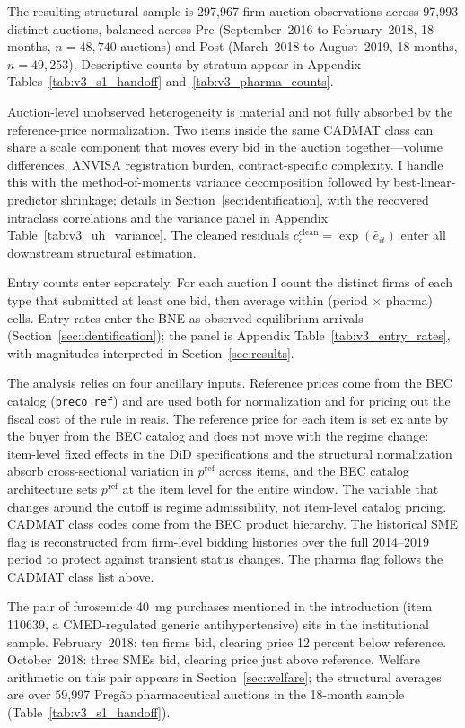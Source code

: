 The resulting structural sample is 297{,}967 firm-auction observations across 97{,}993 distinct auctions, balanced across Pre (September~2016 to February~2018, 18 months, $n = 48{,}740$ auctions) and Post (March~2018 to August~2019, 18 months, $n = 49{,}253$). Descriptive counts by stratum appear in Appendix Tables~\ref{tab:v3_s1_handoff} and~\ref{tab:v3_pharma_counts}.

Auction-level unobserved heterogeneity is material and not fully absorbed by the reference-price normalization. Two items inside the same CADMAT class can share a scale component that moves every bid in the auction together---volume differences, ANVISA registration burden, contract-specific complexity. I handle this with the \citet{krasnokutskaya2011} method-of-moments variance decomposition followed by best-linear-predictor shrinkage; details in Section~\ref{sec:identification}, with the recovered intraclass correlations and the variance panel in Appendix Table~\ref{tab:v3_uh_variance}. The cleaned residuals $c_\epsilon^{\text{clean}} = \exp(\hat e_{it})$ enter all downstream structural estimation.

Entry counts enter separately. For each auction I count the distinct firms of each type that submitted at least one bid, then average within (period $\times$ pharma) cells. Entry rates enter the BNE as observed equilibrium arrivals (Section~\ref{sec:identification}); the panel is Appendix Table~\ref{tab:v3_entry_rates}, with magnitudes interpreted in Section~\ref{sec:results}.

The analysis relies on four ancillary inputs. Reference prices come from the BEC catalog (\texttt{preco\_ref}) and are used both for normalization and for pricing out the fiscal cost of the rule in reais. The reference price for each item is set ex ante by the buyer from the BEC catalog and does not move with the regime change: item-level fixed effects in the DiD specifications and the structural normalization absorb cross-sectional variation in $p^{\mathrm{ref}}$ across items, and the BEC catalog architecture sets $p^{\mathrm{ref}}$ at the item level for the entire window. The variable that changes around the cutoff is regime admissibility, not item-level catalog pricing. CADMAT class codes come from the BEC product hierarchy. The historical SME flag is reconstructed from firm-level bidding histories over the full 2014--2019 period to protect against transient status changes. The pharma flag follows the CADMAT class list above.

The pair of furosemide 40~mg purchases mentioned in the introduction (item 110639, a CMED-regulated generic antihypertensive) sits in the institutional sample. February~2018: ten firms bid, clearing price 12 percent below reference. October~2018: three SMEs bid, clearing price just above reference. Welfare arithmetic on this pair appears in Section~\ref{sec:welfare}; the structural averages are over 59{,}997 Preg\~ao pharmaceutical auctions in the 18-month sample (Table~\ref{tab:v3_s1_handoff}).
